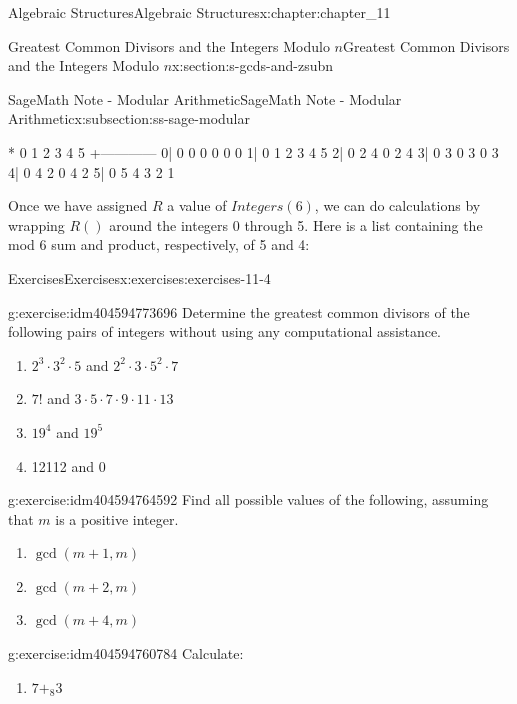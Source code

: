 \documentclass[twoside,10pt,]{book}
\numberwithin{equation}{section}
\begin{document}
\begin{chapterptx}{Algebraic Structures}{}{Algebraic Structures}{}{}{x:chapter:chapter_11}
\begin{sectionptx}{Greatest Common Divisors  and the Integers Modulo \(n\)}{}{Greatest Common Divisors  and the Integers Modulo \(n\)}{}{}{x:section:s-gcds-and-zsubn}
\begin{subsectionptx}{SageMath Note - Modular Arithmetic}{}{SageMath Note - Modular Arithmetic}{}{}{x:subsection:ss-sage-modular}
\begin{sageoutput}
*  0 1 2 3 4 5
 +------------
0| 0 0 0 0 0 0
1| 0 1 2 3 4 5
2| 0 2 4 0 2 4
3| 0 3 0 3 0 3
4| 0 4 2 0 4 2
5| 0 5 4 3 2 1
\end{sageoutput}
Once we have assigned \(R\) a value of \(Integers(6)\),  we can do calculations by wrapping \(R()\) around the integers 0 through 5.  Here is a list containing the mod 6 sum and product, respectively, of 5 and 4:%
\begin{sageinput}
[R(5)+R(4), R(5)*R(4)]
\end{sageinput}
\begin{sageoutput}
[3, 2]
\end{sageoutput}
\end{subsectionptx}
%
%
\typeout{************************************************}
\typeout{************************************************}
%
\begin{exercises-subsection}{Exercises}{}{Exercises}{}{}{x:exercises:exercises-11-4}
\begin{divisionexercise}{1}{}{}{g:exercise:idm404594773696}%
Determine the greatest common divisors of the following pairs of integers without using any computational assistance.%
\begin{enumerate}[label=(\alph*)]
\item{}\(2^3 \cdot 3^2\cdot 5\)   and  \(2^2 \cdot 3 \cdot 5^2\cdot 7\)%
\item{}\(7! \)  and  \(3\cdot 5\cdot 7\cdot 9\cdot 11\cdot 13\)%
\item{}\(19^4\)  and  \(19^5\)%
\item{}12112 and 0%
\end{enumerate}
%
\end{divisionexercise}%
\begin{divisionexercise}{2}{}{}{g:exercise:idm404594764592}%
Find all possible values of the following, assuming that \(m\) is a positive integer.%
\begin{enumerate}[label=(\alph*)]
\item{}\(\gcd(m+1,m)\)%
\item{}\(\gcd(m+2,m)\)%
\item{}\(\gcd(m+4,m)\)%
\end{enumerate}
%
\end{divisionexercise}%
\begin{divisionexercise}{3}{}{}{g:exercise:idm404594760784}%
Calculate:%
\begin{multicols}{2}
\begin{enumerate}[label=(\alph*)]
\item{}\(7 +_8 3\)%

\end{enumerate}
\end{multicols}
\end{divisionexercise}
\end{exercises-subsection}
\end{sectionptx}
\end{chapterptx}
\end{document}
